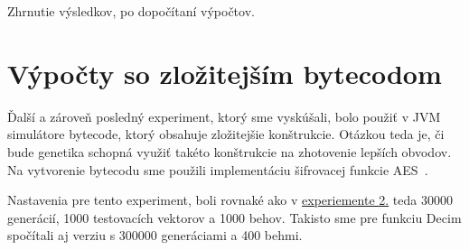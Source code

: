 Zhrnutie výsledkov, po dopočítaní výpočtov.

\section{Výpočty so zložitejším bytecodom}
\label{sec:exp3}

Ďalší a zároveň posledný experiment, ktorý sme vyskúšali, bolo použiť v JVM simulátore bytecode, ktorý obsahuje zložitejšie konštrukcie. Otázkou teda je, či bude genetika schopná využiť takéto konštrukcie na zhotovenie lepších obvodov. Na vytvorenie bytecodu sme použili implementáciu šifrovacej funkcie AES~\parencite{AES-FIPS}.

Nastavenia pre tento experiment, boli rovnaké ako v \hyperref[sec:exp2]{experiemente 2.} teda 30000 generácií, 1000 testovacích vektorov a 1000 behov. Takisto sme pre funkciu Decim spočítali aj verziu s 300000 generáciami a 400 behmi. 
